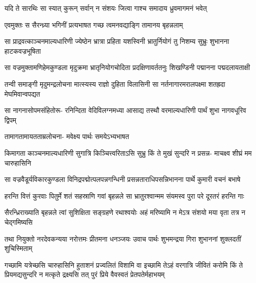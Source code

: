 \twolineshloka
{यदि ते सारथिः सा स्यात् कुरून् सर्वान् न संशयः}
{जित्वा गाश्च समादाय ध्रुवमागमनं भवेत्}



\twolineshloka
{एवमुक्तः स सैरन्ध्र्या भगिनीं प्रत्यभाषत}
{गच्छ त्वमनवद्याङ्गि तामानय बृहन्नलाम्}


\fourlineindentedshloka
{सा प्राद्रवत्काञ्चनमाल्यधारिणी}
{ज्येष्ठेन भ्रात्रा प्रहिता यशस्विनी}
{भ्रातुर्नियोगं तु निशम्य सुभ्रुः}
{शुभानना हाटकवज्रभूषिता}


\fourlineindentedshloka
{सा वज्रमुक्तामणिहेमकुण्डला}
{मृदुक्रमा भ्रातृनियोगचोदिता}
{प्रदक्षिणावर्ततनुः शिखण्डिनी}
{पद्मानना पद्मदलायताक्षी}


\fourlineindentedshloka
{तन्वी समाङ्गी मृदुमन्द्रलोचना}
{मात्स्यस्य राज्ञो दुहिता विलासिनी}
{सा नर्तनागारमरालपक्ष्मा}
{शतह्रदा मेघमिवान्वपद्यत}


\fourlineindentedshloka
{सा नागनासोपमसंहितोरू-}
{रनिन्दिता वेदिविलग्नमध्या}
{आसाद्य तस्थौ वरमाल्यधारिणी}
{पार्थं शुभा नागवधूरिव द्विपम्}


\onelineindentedshloka
{तामागतामायतताम्रलोचना-}
{मवेक्ष्य पार्थः समयेऽभ्यभाषत}


\fourlineindentedshloka
{किमागता काञ्चनमाल्यधारिणी}
{सुगात्रि किञ्चित्त्वरिताऽसि सुभ्रु}
{किं ते मुखं सुन्दरि न प्रसन्न-}
{माचक्ष्व शीघ्रं मम चारुहासिनि}



\fourlineindentedshloka
{सा वज्रवैडूर्यविकारकुण्डला}
{विनिद्रपद्मोत्पलपन्नगन्धिनी}
{प्रसन्नताराधिपसन्निभानना}
{पार्थे कुमारी वचनं बभाषे}




\fourlineindentedshloka
{हरन्ति वित्तं कुरवाः पितुर्मे}
{शतं सहस्राणि गवां बृहन्नले}
{सा भ्रातुरश्वान्मम संयमस्व}
{पुरा परे दूरतरं हरन्ति गाः}


\fourlineindentedshloka
{सैरन्ध्रिराख्याति बृहन्नले त्वां}
{सुशिक्षिता सङ्ग्रहणे रथाश्वयोः}
{अहं मरिष्यामि न मेऽत्र संशयो}
{मया वृता तत्र न चेद्गमिष्यसि}



\fourlineindentedshloka
{तथा नियुक्तो नरदेवकन्यया}
{नरोत्तमः प्रीतमना धनञ्जयः}
{उवाच पार्थः शुभमन्द्रया गिरा}
{शुभाननां शुक्लदतीं शुचिस्मिताम्}


\sixlineindentedshloka
{गच्छामि यत्रेच्छसि चारुहासिनि}
{हुताशनं प्रज्वलितं विशामि वा}
{इच्छामि तेऽहं वरगात्रि जीवितं}
{करोमि किं ते प्रियमद्यसुन्दरि}
{न मत्कृते द्रक्ष्यसि तत् पुरं प्रिये}
{वैवस्वतं प्रेतपतेर्महाभयम्}


